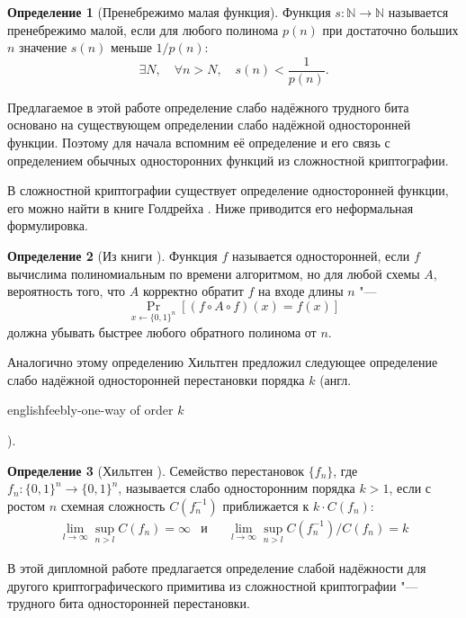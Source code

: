 \documentclass[oneside, a4paper]{article}
\theoremstyle{definition}
\newtheorem{definition}{Определение}
\theoremstyle{remark}
\begin{document}
\begin{definition}[Пренебрежимо малая функция]
Функция $s : \mathbb N \to \mathbb N$ называется пренебрежимо малой, если для
любого полинома $p(n)$ при достаточно больших $n$ значение $s(n)$ меньше $1 /
p(n)$:
\[
\exists N,\quad \forall n > N,\quad s(n) < \frac 1 {p(n)}.
\]
\end{definition}

Предлагаемое в этой работе определение слабо надёжного трудного бита основано
на существующем определении слабо надёжной односторонней функции. Поэтому для
начала вспомним её определение и его связь с определением обычных односторонних
функций из сложностной криптографии.

В сложностной криптографии существует определение односторонней функции, его
можно найти в книге Голдрейха \cite{goldreich}. Ниже приводится его неформальная
формулировка.

\begin{definition}[Из книги \cite{goldreich}]
Функция $f$ называется односторонней, если $f$ вычислима полиномиальным по
времени алгоритмом, но для любой схемы $A$, вероятность того, что $A$ корректно
обратит $f$ на входе длины $n$ "---
\[
\Pr_{x \gets \{0, 1\}^n}[(f \circ A \circ f)(x) = f(x)]
\]
должна убывать быстрее любого обратного полинома от $n$.
\end{definition}

Аналогично этому определению Хильтген \cite{hiltgen1993} предложил
следующее определение слабо надёжной односторонней перестановки порядка
$k$ (англ. \begin{foreignlanguage}{english}feebly-one-way of order
$k$\end{foreignlanguage}).

\begin{definition}[Хильтген \cite{hiltgen1993}]
Семейство перестановок $\{f_n\}$, где $f_n : \{0, 1\}^n \to \{0, 1\}^n$,
называется слабо односторонним порядка $k > 1$, если с ростом $n$ схемная
сложность $C(f_n^{-1})$ приближается к $k \cdot C(f_n)$:
\[
\begin{aligned}
&\lim_{l \to \infty} \sup_{n > l} C(f_n) = \infty
&
\text{и}&
&
\lim_{l \to \infty} \sup_{n > l} C(f_n^{-1}) / C(f_n) = k&
\end{aligned}
\]
\end{definition}

В этой дипломной работе предлагается определение слабой надёжности для другого
криптографического примитива из сложностной криптографии "--- трудного бита
односторонней перестановки.
\end{document}
